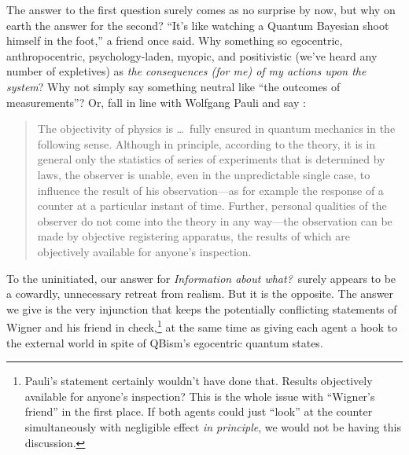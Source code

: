 The answer to the first question surely comes as no surprise by now, but why on earth the answer for the second?  ``It's like watching a Quantum Bayesian shoot himself in the foot,'' a friend once said. Why something so egocentric, anthro\-po\-centric, psychology-laden, myopic, and positivistic (we've heard any number of expletives) as {\it the consequences (for me) of my actions upon the system}?  Why not simply say something neutral like ``the outcomes of measurements''?  Or, fall in line with Wolfgang Pauli and say \cite{Pauli94}:
\begin{quote}\small
The objectivity of physics is \ldots\ fully ensured in quantum mechanics in the following sense.  Although in principle, according to the theory, it is in general only the statistics of series of experiments that is determined by laws, the observer is unable, even in the unpredictable single case, to influence the result of his observation---as for example the response of a counter at a particular instant of time.  Further, personal qualities of the observer do not come into the theory in any way---the observation can be made by objective registering apparatus, the results of which are objectively available for anyone's inspection.
\end{quote}
To the uninitiated, our answer for {\it Information about what?}\ surely appears to be a cowardly, unnecessary retreat from realism.  But it is the opposite.  The answer we give is the very injunction that keeps the potentially conflicting statements of Wigner and his friend in check,\footnote{Pauli's statement certainly wouldn't have done that.  Results objectively available for anyone's inspection?  This is the whole issue with ``Wigner's friend'' in the first place.  If both agents could just ``look'' at the counter simultaneously with negligible effect {\it in principle}, we would not be having this discussion.} at the same time as giving each agent a hook to the external world in spite of QBism's egocentric quantum states.

